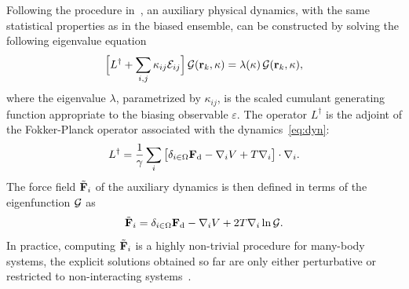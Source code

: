\documentclass[pre, superscriptaddress, twocolumn,pre]{revtex4-1}
\begin{document}
Following the procedure in~\cite{Chetrite2013}, an auxiliary physical dynamics, with the same statistical properties as in the biased ensemble, can be constructed by solving the following eigenvalue equation 
\begin{equation}\label{eq:adjointbiased}
	\Big[L^\dagger + \sum_{i,j}\kappa_{ij}{\cal E}_{ij}\Big]\,{\cal G}({\bf r}_k,\kappa) = \lambda(\kappa)\,{\cal G}({\bf r}_k,\kappa) ,
\end{equation}
where the eigenvalue $\lambda$, parametrized by $\kappa_{ij}$, is the scaled cumulant generating function appropriate to the biasing observable $\varepsilon$. The operator $L^\dagger$ is the adjoint of the Fokker-Planck operator associated with the dynamics~\eqref{eq:dyn}:
\begin{equation}\label{eq:L}
	L^\dagger = \frac{1}{\gamma} \sum_i\big[ \delta_{i\in\Omega}{\bf F}_{\rm d} - \nabla_i V + T \nabla_i\big] \cdot\nabla_i .
\end{equation}
The force field $\tilde{\bf F}_i$ of the auxiliary dynamics is then defined in terms of the eigenfunction ${\cal G}$ as 
\begin{equation}
	\tilde{\bf F}_i = \delta_{i\in\Omega}{\bf F}_{\rm d} - \nabla_iV + 2 T \nabla_i \ln{\cal G} .
\end{equation}
In practice, computing $\tilde {\bf F}_i$ is a highly non-trivial procedure for many-body systems, the explicit solutions obtained so far are only either perturbative or restricted to non-interacting systems~\cite{Nemoto2018a, Chetrite2013, Touchette2016}.
\end{document}
